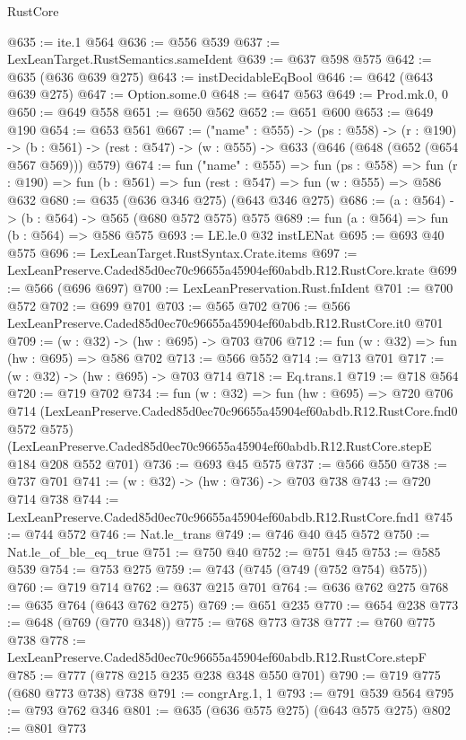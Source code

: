 \begin{lexlean}{RustCore}
\begin{coremodule}
@635 := ite.{1} @564
@636 := @556 @539
@637 := LexLeanTarget.RustSemantics.sameIdent
@639 := @637 @598 @575
@642 := @635 (@636 @639 @275)
@643 := instDecidableEqBool
@646 := @642 (@643 @639 @275)
@647 := Option.some.{0}
@648 := @647 @563
@649 := Prod.mk.{0, 0}
@650 := @649 @558
@651 := @650 @562
@652 := @651 @600
@653 := @649 @190
@654 := @653 @561
@667 := ("name" : @555) ->
  (ps : @558) ->
  (r : @190) ->
  (b : @561) -> (rest : @547) -> (w : @555) -> @633 (@646 (@648 (@652 (@654 @567 @569))) @579)
@674 := fun ("name" : @555) =>
  fun (ps : @558) =>
  fun (r : @190) => fun (b : @561) => fun (rest : @547) => fun (w : @555) => @586 @632
@680 := @635 (@636 @346 @275) (@643 @346 @275)
@686 := (a : @564) -> (b : @564) -> @565 (@680 @572 @575) @575
@689 := fun (a : @564) => fun (b : @564) => @586 @575
@693 := LE.le.{0} @32 instLENat
@695 := @693 @40 @575
@696 := LexLeanTarget.RustSyntax.Crate.items
@697 := LexLeanPreserve.Caded85d0ec70c96655a45904ef60abdb.R12.RustCore.krate
@699 := @566 (@696 @697)
@700 := LexLeanPreservation.Rust.fnIdent
@701 := @700 @572
@702 := @699 @701
@703 := @565 @702
@706 := @566 LexLeanPreserve.Caded85d0ec70c96655a45904ef60abdb.R12.RustCore.it0 @701
@709 := (w : @32) -> (hw : @695) -> @703 @706
@712 := fun (w : @32) => fun (hw : @695) => @586 @702
@713 := @566 @552
@714 := @713 @701
@717 := (w : @32) -> (hw : @695) -> @703 @714
@718 := Eq.trans.{1}
@719 := @718 @564
@720 := @719 @702
@734 := fun (w : @32) =>
  fun (hw : @695) =>
  @720
    @706
    @714
    (LexLeanPreserve.Caded85d0ec70c96655a45904ef60abdb.R12.RustCore.fnd0 @572 @575)
    (LexLeanPreserve.Caded85d0ec70c96655a45904ef60abdb.R12.RustCore.stepE @184 @208 @552 @701)
@736 := @693 @45 @575
@737 := @566 @550
@738 := @737 @701
@741 := (w : @32) -> (hw : @736) -> @703 @738
@743 := @720 @714 @738
@744 := LexLeanPreserve.Caded85d0ec70c96655a45904ef60abdb.R12.RustCore.fnd1
@745 := @744 @572
@746 := Nat.le_trans
@749 := @746 @40 @45 @572
@750 := Nat.le_of_ble_eq_true
@751 := @750 @40
@752 := @751 @45
@753 := @585 @539
@754 := @753 @275
@759 := @743 (@745 (@749 (@752 @754) @575))
@760 := @719 @714
@762 := @637 @215 @701
@764 := @636 @762 @275
@768 := @635 @764 (@643 @762 @275)
@769 := @651 @235
@770 := @654 @238
@773 := @648 (@769 (@770 @348))
@775 := @768 @773 @738
@777 := @760 @775 @738
@778 := LexLeanPreserve.Caded85d0ec70c96655a45904ef60abdb.R12.RustCore.stepF
@785 := @777 (@778 @215 @235 @238 @348 @550 @701)
@790 := @719 @775 (@680 @773 @738) @738
@791 := congrArg.{1, 1}
@793 := @791 @539 @564
@795 := @793 @762 @346
@801 := @635 (@636 @575 @275) (@643 @575 @275)
@802 := @801 @773

\end{coremodule}
\end{lexlean}
